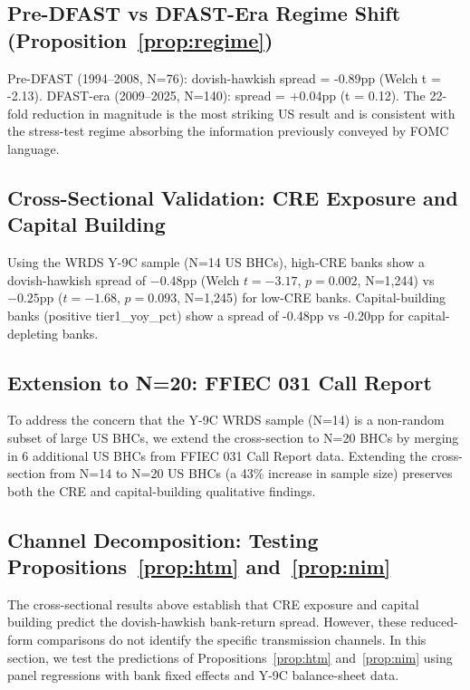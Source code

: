 \documentclass[12pt,a4paper]{article}
\begin{document}
\subsection{Pre-DFAST vs DFAST-Era Regime Shift (Proposition~\ref{prop:regime})}

Pre-DFAST (1994–2008, N=76): dovish-hawkish spread = -0.89pp (Welch t = -2.13). DFAST-era (2009–2025, N=140): spread = +0.04pp (t = 0.12). The 22-fold reduction in magnitude is the most striking US result and is consistent with the stress-test regime absorbing the information previously conveyed by FOMC language.

\subsection{Cross-Sectional Validation: CRE Exposure and Capital Building}

Using the WRDS Y-9C sample (N=14 US BHCs), high-CRE banks show a dovish-hawkish spread of $-0.48$pp (Welch $t = -3.17$, $p = 0.002$, N=1,244) vs $-0.25$pp ($t = -1.68$, $p = 0.093$, N=1,245) for low-CRE banks. Capital-building banks (positive tier1\_yoy\_pct) show a spread of -0.48pp vs -0.20pp for capital-depleting banks.

\subsection{Extension to N=20: FFIEC 031 Call Report}

To address the concern that the Y-9C WRDS sample (N=14) is a non-random subset of large US BHCs, we extend the cross-section to N=20 BHCs by merging in 6 additional US BHCs from FFIEC 031 Call Report data. Extending the cross-section from N=14 to N=20 US BHCs (a 43\% increase in sample size) preserves both the CRE and capital-building qualitative findings.

\subsection{Channel Decomposition: Testing Propositions~\ref{prop:htm} and~\ref{prop:nim}}

The cross-sectional results above establish that CRE exposure and capital building predict the dovish-hawkish bank-return spread. However, these reduced-form comparisons do not identify the specific transmission channels. In this section, we test the predictions of Propositions~\ref{prop:htm} and~\ref{prop:nim} using panel regressions with bank fixed effects and Y-9C balance-sheet data.
\end{document}
